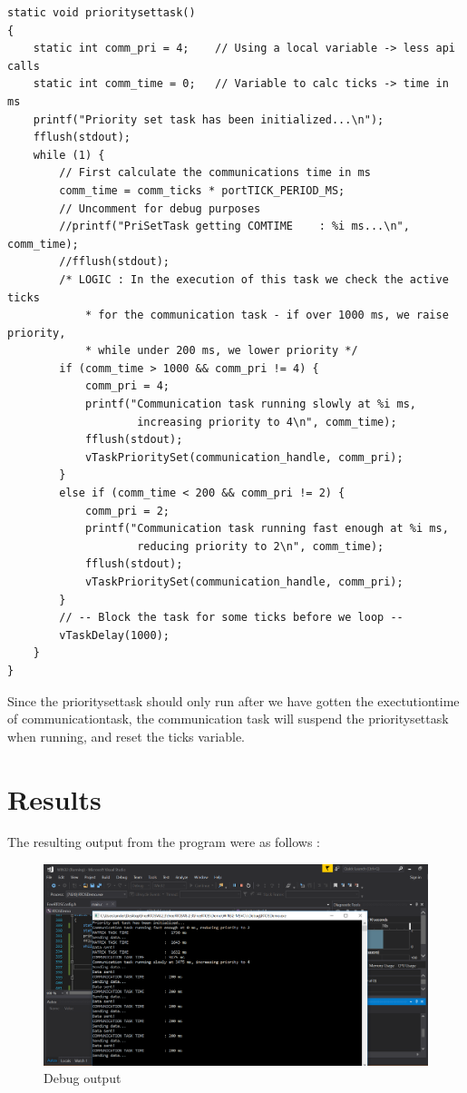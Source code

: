 \documentclass[12pt,fleqn,leqno,letterpaper]{article}
\begin{document}
        \begin{verbatim}
static void prioritysettask()
{
    static int comm_pri = 4;    // Using a local variable -> less api calls
    static int comm_time = 0;	// Variable to calc ticks -> time in ms
    printf("Priority set task has been initialized...\n");
    fflush(stdout);
    while (1) {
        // First calculate the communications time in ms
        comm_time = comm_ticks * portTICK_PERIOD_MS;
        // Uncomment for debug purposes
        //printf("PriSetTask getting COMTIME    : %i ms...\n", comm_time);
        //fflush(stdout);
        /* LOGIC : In the execution of this task we check the active ticks
            * for the communication task - if over 1000 ms, we raise priority,
            * while under 200 ms, we lower priority */
        if (comm_time > 1000 && comm_pri != 4) {
            comm_pri = 4;
            printf("Communication task running slowly at %i ms, 
                    increasing priority to 4\n", comm_time);
            fflush(stdout);
            vTaskPrioritySet(communication_handle, comm_pri);
        }
        else if (comm_time < 200 && comm_pri != 2) {
            comm_pri = 2;
            printf("Communication task running fast enough at %i ms, 
                    reducing priority to 2\n", comm_time);
            fflush(stdout);
            vTaskPrioritySet(communication_handle, comm_pri);
        }
        // -- Block the task for some ticks before we loop --
        vTaskDelay(1000);
    }
}
        \end{verbatim}

        Since the prioritysettask should only run after we have gotten the exectutiontime of communicationtask, 
        the communication task will suspend the prioritysettask when running, and reset the ticks variable. \\

    \section*{Results}

        The resulting output from the program were as follows : \\

        \begin{figure}[h]
            \centering
            \includegraphics[width=\textwidth]{Debug_1.png}
            \caption{Debug output}
            \label{figure:debug1}
        \end{figure}
\end{document}
